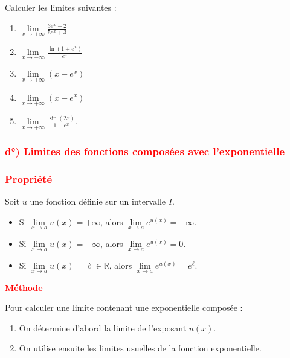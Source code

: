 \documentclass[12pt,a4paper]{article}
\begin{document}
Calculer les limites suivantes :
\begin{enumerate}
\item \(
\lim\limits_{x\to+\infty}\frac{3e^x-2}{5e^x+3}
\)
\item \(
\lim\limits_{x\to-\infty}\frac{\ln(1+e^x)}{e^x}
\)
\item \(
\lim\limits_{x\to+\infty}(x-e^x)
\)
\item \(
\lim\limits_{x\to+\infty}(x-e^x)
\)
\item \(
\lim\limits_{x\to+\infty}\frac{\sin(2x)}{1-e^x}.
\)
\end{enumerate}

\subsubsection*{\underline{\textbf{\textcolor{red}{ d°) Limites des fonctions composées avec l'exponentielle  }}}}

\subsubsection*{\underline{\textbf{\textcolor{red}{ Propriété }}}}

Soit \(u\) une fonction définie sur un intervalle \(I\).

\begin{itemize}
    \item Si \(\displaystyle\lim\limits_{x\to a}u(x)=+\infty\), alors
    \(
    \lim\limits_{x\to a}e^{u(x)}=+\infty.
    \)

    \item Si \(\displaystyle\lim\limits_{x\to a}u(x)=-\infty\), alors
    \(
    \lim\limits_{x\to a}e^{u(x)}=0.
    \)

    \item Si \(\displaystyle\lim\limits_{x\to a}u(x)=\ell\in\mathbb{R}\), alors
    \(
    \lim\limits_{x\to a}e^{u(x)}=e^{\ell}.
    \)
\end{itemize}

\underline{\textbf{\textcolor{red}{Méthode}}}

Pour calculer une limite contenant une exponentielle composée :

\begin{enumerate}
    \item On détermine d'abord la limite de l'exposant \(u(x)\).
    \item On utilise ensuite les limites usuelles de la fonction exponentielle.
\end{enumerate}
\end{document}
